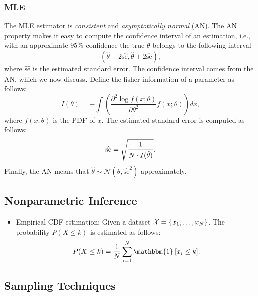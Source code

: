 \subsubsection{MLE}
    The MLE estimator is \emph{consistent} and \emph{asymptotically normal} (AN).
    The AN property makes it easy to compute the confidence interval of an estimation, i.e., with an approximate $95\%$ confidence  the true $\theta$ belongs to the following interval
        \begin{equation}
            \left( \hat{\theta} - 2\hat{\text{se}},  \hat{\theta} + 2\hat{\text{se}} \right),
        \end{equation}
    where $\hat{\text{se}}$ is the estimated standard error.
    The confidence interval comes from the AN, which we now discuss.
    Define the fisher information of a parameter as follows:
        \begin{equation}
            I(\theta) = -\int \left( \frac{\partial^2 \log f(x; \theta)}{\partial \theta^2} f(x; \theta) \right) d x,
        \end{equation}
    where $f(x; \theta)$ is the PDF of $x$.
    The estimated standard error is computed as follows:
        \begin{equation}
            \hat{\text{se}} = \sqrt{\frac{1}{N \cdot I(\hat{\theta})}}.
        \end{equation}
    Finally, the AN means that $\hat{\theta} \sim \mathcal{N}(\theta, \hat{\text{se}}^2 )$ approximately.
    

\subsection{Nonparametric Inference}
    \begin{itemize}
        \item Empirical CDF estimation: Given a dataset $\mathcal{X}=\{ x_1, \ldots, x_N \}$.
        The probability $P(X \le k)$ is estimated as follows:
            \begin{equation}
                P(X \le k) = \frac{1}{\ndata}\sum_{i=1}^{\ndata}{\mathbbm{1}
                    \left[ x_i \le k \right]
                }.
            \end{equation}
    \end{itemize}
    
    
\subsection{Sampling Techniques}
